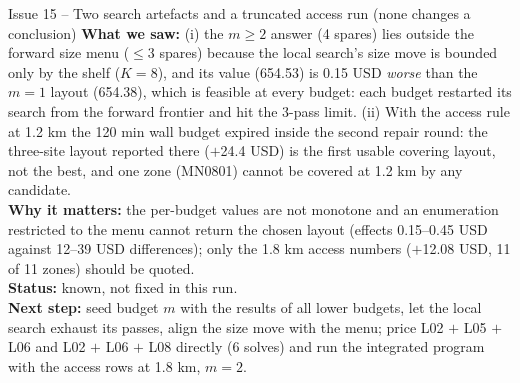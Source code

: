 \begin{issuebox}{Issue 15 -- Two search artefacts and a truncated access run (none changes a conclusion)}
\textbf{What we saw:} (i) the $m \ge 2$ answer (4 spares) lies outside the forward size menu ($\le 3$ spares) because the local search's size move is bounded only by the shelf ($K = 8$), and its value (654.53) is 0.15 USD \emph{worse} than the $m = 1$ layout (654.38), which is feasible at every budget: each budget restarted its search from the forward frontier and hit the 3-pass limit. (ii) With the access rule at 1.2 km the 120 min wall budget expired inside the second repair round: the three-site layout reported there ($+$24.4 USD) is the first usable covering layout, not the best, and one zone (MN0801) cannot be covered at 1.2 km by any candidate.\\
\textbf{Why it matters:} the per-budget values are not monotone and an enumeration restricted to the menu cannot return the chosen layout (effects 0.15--0.45 USD against 12--39 USD differences); only the 1.8 km access numbers ($+$12.08 USD, 11 of 11 zones) should be quoted.\\
\textbf{Status:} known, not fixed in this run.\\
\textbf{Next step:} seed budget $m$ with the results of all lower budgets, let the local search exhaust its passes, align the size move with the menu; price L02 $+$ L05 $+$ L06 and L02 $+$ L06 $+$ L08 directly (6 solves) and run the integrated program with the access rows at 1.8 km, $m = 2$.
\end{issuebox}

